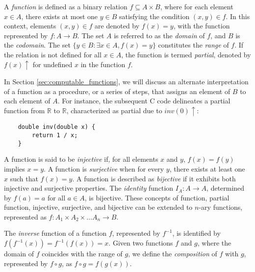 
A \emph{function} is defined as a binary relation $f \subseteq A \times B$, where for each element $x \in A$, there exists at most one $y \in B$ satisfying the condition $\left(x, y\right) \in f$. In this context, elements $\left(x, y\right) \in f$ are denoted by $f(x)=y$, with the function represented by $f : A \rightarrow B$. The set $A$ is referred to as the \emph{domain} of $f$, and $B$ is the \emph{codomain}. The set $\{ y \in B : \exists x \in A , f(x) = y\}$ constitutes the \emph{range} of $f$. If the relation is not defined for all $x \in A$, the function is termed \emph{partial}, denoted by $f(x) \uparrow$ for undefined $x$ in the function $f$. 

\begin{example}
In Section \ref{sec:computable_functions}, we will discuss an alternate interpretation of a function as a procedure, or a series of steps, that assigns an element of $B$ to each element of $A$. For instance, the subsequent C code delineates a partial function from $\mathbb{R}$ to $\mathbb{R}$, characterized as partial due to $inv(0)\uparrow$:
\begin{verbatim}
    double inv(double x) {
        return 1 / x;
    }
\end{verbatim}
\end{example}

A function is said to be \emph{injective} if, for all elements $x$ and $y$, $f(x) = f(y)$ implies $x=y$. A function is \emph{surjective} when for every $y$, there exists at least one $x$ such that $f(x) = y$. A function is described as \emph{bijective} if it exhibits both injective and surjective properties. The \emph{identity} function $I_A : A \rightarrow A$, determined by $f(a) = a$ for all $a \in A$, is bijective. These concepts of function, partial function, injective, surjective, and bijective can be extended to $n$-ary functions, represented as $f: A_1 \times A_2 \times \dots A_n \rightarrow B$.

The \emph{inverse} function of a function $f$, represented by $f^{-1}$, is identified by $f(f^{-1}(x)) = f^{-1}(f(x)) = x$. Given two functions $f$ and $g$, where the domain of $f$ coincides with the range of $g$, we define the \emph{composition} of $f$ with $g$, represented by $f \circ g$, as $f \circ g = f(g(x))$.

